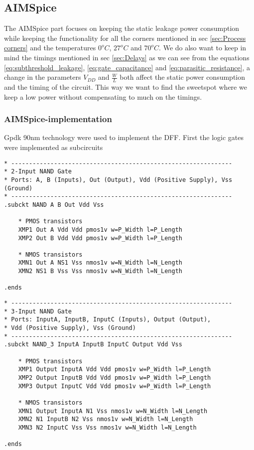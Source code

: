 \subsection{AIMSpice}
The AIMSpice part focuses on keeping the static leakage power consumption while keeping the functionality for all the corners mentioned in sec \ref{sec:Process corners} and the temperatures $0^o C$, $27^o C$ and $70^o C$. We do also want to keep in mind the timings mentioned in sec \ref{sec:Delays} as we can see from the equations \ref{eq:subthreshold_leakage}, \ref{eq:gate_capacitance} and \ref{eq:parasitic_resistance}, a change in the parameters $V_{DD}$ and $\frac{W}{L}$ both affect the static power consumption and the timing of the circuit. This way we want to find the sweetspot where we keep a low power without compensating to much on the timings.

\subsubsection{AIMSpice-implementation}
Gpdk 90nm technology were used to implement the DFF. First the logic gates were implemented as subcircuits

\begin{lstlisting}
* --------------------------------------------------------------
* 2-Input NAND Gate
* Ports: A, B (Inputs), Out (Output), Vdd (Positive Supply), Vss (Ground)
* --------------------------------------------------------------
.subckt NAND A B Out Vdd Vss

    * PMOS transistors
    XMP1 Out A Vdd Vdd pmos1v w=P_Width l=P_Length 
    XMP2 Out B Vdd Vdd pmos1v w=P_Width l=P_Length 

    * NMOS transistors
    XMN1 Out A NS1 Vss nmos1v w=N_Width l=N_Length 
    XMN2 NS1 B Vss Vss nmos1v w=N_Width l=N_Length 

.ends
\end{lstlisting}

\begin{lstlisting}
* --------------------------------------------------------------
* 3-Input NAND Gate
* Ports: InputA, InputB, InputC (Inputs), Output (Output), 
* Vdd (Positive Supply), Vss (Ground)
* --------------------------------------------------------------
.subckt NAND_3 InputA InputB InputC Output Vdd Vss

    * PMOS transistors
    XMP1 Output InputA Vdd Vdd pmos1v w=P_Width l=P_Length 
    XMP2 Output InputB Vdd Vdd pmos1v w=P_Width l=P_Length
    XMP3 Output InputC Vdd Vdd pmos1v w=P_Width l=P_Length

    * NMOS transistors
    XMN1 Output InputA N1 Vss nmos1v w=N_Width l=N_Length 
    XMN2 N1 InputB N2 Vss nmos1v w=N_Width l=N_Length
    XMN3 N2 InputC Vss Vss nmos1v w=N_Width l=N_Length  

.ends
\end{lstlisting}

